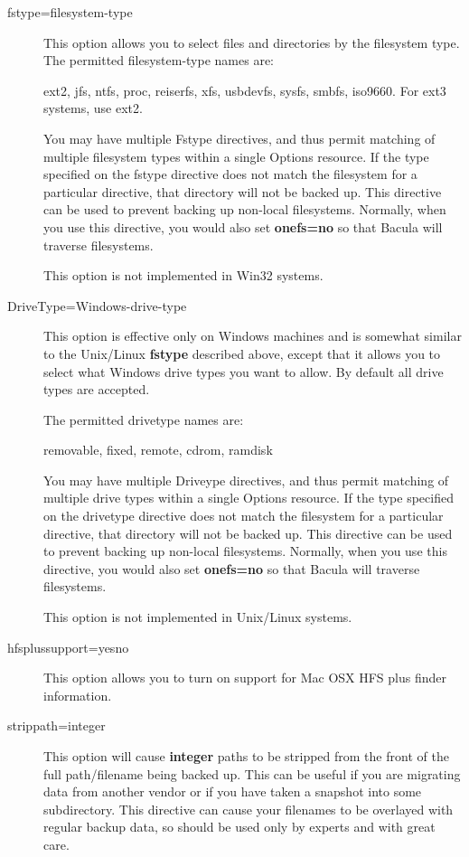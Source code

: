 \begin{description}
\item [fstype=filesystem-type]
   This option allows you to select files and directories by the
   filesystem type.  The permitted filesystem-type names are:

   ext2, jfs, ntfs, proc, reiserfs, xfs, usbdevfs, sysfs, smbfs,
   iso9660.  For ext3 systems, use ext2.

   You may have multiple Fstype directives, and thus permit matching
   of multiple filesystem types within a single Options resource.  If
   the type specified on the fstype directive does not match the
   filesystem for a particular directive, that directory will not be
   backed up.  This directive can be used to prevent backing up
   non-local filesystems. Normally, when you use this directive, you
   would also set {\bf onefs=no} so that Bacula will traverse filesystems.

   This option is not implemented in Win32 systems.

\item [DriveType=Windows-drive-type]
   This option is effective only on Windows machines and is
   somewhat similar to the Unix/Linux {\bf fstype} described
   above, except that it allows you to select what Windows
   drive types you want to allow.  By default all drive
   types are accepted.

   The permitted drivetype names are:

   removable, fixed, remote, cdrom, ramdisk

   You may have multiple Driveype directives, and thus permit matching
   of multiple drive types within a single Options resource.  If
   the type specified on the drivetype directive does not match the
   filesystem for a particular directive, that directory will not be
   backed up.  This directive can be used to prevent backing up
   non-local filesystems. Normally, when you use this directive, you
   would also set {\bf onefs=no} so that Bacula will traverse filesystems.

   This option is not implemented in Unix/Linux systems.


\item [hfsplussupport=yes\vb{}no]
   This option allows you to turn on support for Mac OSX HFS plus 
   finder information.

\item [strippath=\lt{}integer\gt{}]
   This option will cause {\bf integer} paths to be stripped from
   the front of the full path/filename being backed up. This can
   be useful if you are migrating data from another vendor or if
   you have taken a snapshot into some subdirectory.  This directive
   can cause your filenames to be overlayed with regular backup data,
   so should be used only by experts and with great care.
\end{description}

